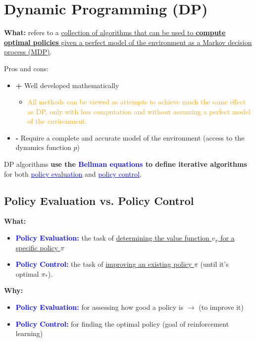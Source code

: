 \documentclass[12pt, a4paper]{article}
\let\stdsection\section
\renewcommand\section{\newpage\stdsection} %
\begin{document}
\section{Dynamic Programming (DP)}\label{dynamic-programming}


\textbf{What:} refers to a \uline{collection of algorithms that can be used to \textbf{compute optimal policies} given a perfect model of the environment as a Markov decision process (MDP)}.


Pros and cons:

\begin{itemize}
  \item \textbf{+} Well developed mathematically
  \begin{itemize}
    \item \textcolor{orange}{All methods can be viewed as attempts to achieve much the same effect as DP, only with less computation and without assuming a perfect model of the environment.}
  \end{itemize}
  \item \textbf{-} Require a complete and accurate model of the environment (access to the dynamics function $p$)
\end{itemize}


DP algorithms \textbf{use the \textcolor{blue}{Bellman equations} to define iterative algorithms} for both \textcolor{blue}{\uline{policy evaluation}} and \textcolor{blue}{\uline{policy control}}.




\subsection{Policy Evaluation vs. Policy Control}\label{policy-evaluation-vs-policy-control}

\textbf{What:}
\begin{itemize}
  \item \textbf{\textcolor{blue}{Policy Evaluation:}} the task of \uline{determining the value function $v_\pi$ for a specific policy $\pi$}
  \item \textbf{\textcolor{blue}{Policy Control:}} the task of \uline{improving an existing policy $\pi$} (until it's optimal $\pi_*$).
\end{itemize}

\textbf{Why:}
\begin{itemize}
  \item \textbf{\textcolor{blue}{Policy Evaluation:}} for assessing how good a policy is $\rightarrow$ (to improve it)
  \item \textbf{\textcolor{blue}{Policy Control:}} for finding the optimal policy (goal of reinforcement learning)
\end{itemize}
\end{document}
